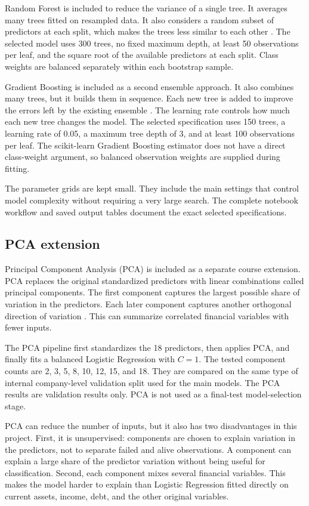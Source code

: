 \documentclass[11pt,a4paper]{article}
\begin{document}
Random Forest is included to reduce the variance of a single tree. It averages
many trees fitted on resampled data. It also considers a random subset of
predictors at each split, which makes the trees less similar to each other
\citep{breiman2001}. The selected model uses 300 trees, no fixed maximum depth,
at least 50 observations per leaf, and the square root of the available
predictors at each split. Class weights are balanced separately within each
bootstrap sample.

Gradient Boosting is included as a second ensemble approach. It also combines
many trees, but it builds them in sequence. Each new tree is added to improve
the errors left by the existing ensemble \citep{friedman2001}. The learning
rate controls how much each new tree changes the model. The selected
specification uses 150 trees, a learning rate of 0.05, a maximum tree depth of
3, and at least 100 observations per leaf. The scikit-learn Gradient Boosting
estimator does not have a direct class-weight argument, so balanced observation
weights are supplied during fitting.

The parameter grids are kept small. They include the main settings that control
model complexity without requiring a very large search. The complete notebook
workflow and saved output tables document the exact selected specifications.

\subsection{PCA extension}

Principal Component Analysis (PCA) is included as a separate course extension.
PCA replaces the original standardized predictors with linear combinations
called principal components. The first component captures the largest possible
share of variation in the predictors. Each later component captures another
orthogonal direction of variation \citep{jolliffe2016}. This can summarize
correlated financial variables with fewer inputs.

The PCA pipeline first standardizes the 18 predictors, then applies PCA, and
finally fits a balanced Logistic Regression with $C=1$. The tested component
counts are 2, 3, 5, 8, 10, 12, 15, and 18. They are compared on the same type
of internal company-level validation split used for the main models. The PCA
results are validation results only. PCA is not used as a final-test
model-selection stage.

PCA can reduce the number of inputs, but it also has two disadvantages in this
project.
First, it is unsupervised: components are chosen to explain variation in the
predictors, not to separate failed and alive observations. A component can
explain a large share of the predictor variation without being useful for
classification.
Second, each component mixes several financial variables. This makes the model
harder to explain than Logistic Regression fitted directly on current assets,
income, debt, and the other original variables.
\end{document}
